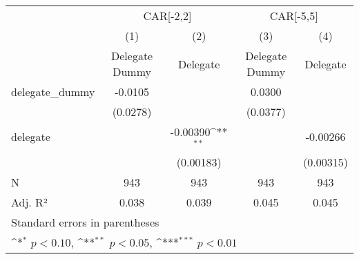{
\def\sym#1{\ifmmode^{#1}\else\(^{#1}\)\fi}
\begin{tabular}{l*{4}{c}}
\hline\hline
                    &\multicolumn{2}{c}{CAR[-2,2]}              &\multicolumn{2}{c}{CAR[-5,5]}              \\
                    &\multicolumn{1}{c}{(1)}&\multicolumn{1}{c}{(2)}&\multicolumn{1}{c}{(3)}&\multicolumn{1}{c}{(4)}\\
                    &\multicolumn{1}{c}{Delegate Dummy}&\multicolumn{1}{c}{Delegate}&\multicolumn{1}{c}{Delegate Dummy}&\multicolumn{1}{c}{Delegate}\\
\hline
delegate\_dummy      &     -0.0105         &                     &      0.0300         &                     \\
                    &    (0.0278)         &                     &    (0.0377)         &                     \\
delegate            &                     &    -0.00390\sym{**} &                     &    -0.00266         \\
                    &                     &   (0.00183)         &                     &   (0.00315)         \\
\hline
N                   &         943         &         943         &         943         &         943         \\
Adj. R²             &       0.038         &       0.039         &       0.045         &       0.045         \\
\hline\hline
\multicolumn{5}{l}{\footnotesize Standard errors in parentheses}\\
\multicolumn{5}{l}{\footnotesize \sym{*} \(p<0.10\), \sym{**} \(p<0.05\), \sym{***} \(p<0.01\)}\\
\end{tabular}
}
